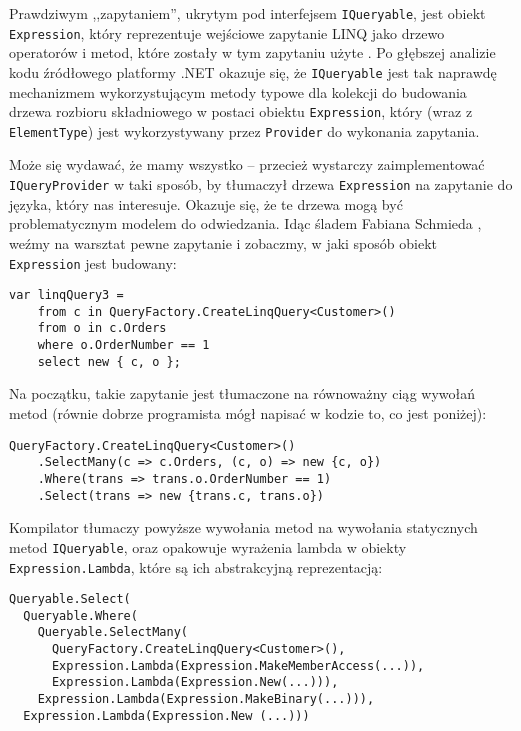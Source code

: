 Prawdziwym ,,zapytaniem'', ukrytym pod interfejsem \texttt{IQueryable}, jest obiekt \texttt{Expression}, który reprezentuje wejściowe zapytanie LINQ jako drzewo operatorów i metod, które zostały w tym zapytaniu użyte \cite{linq_queryable}. Po głębszej analizie kodu źródłowego platformy .NET okazuje się, że \texttt{IQueryable} jest tak naprawdę mechanizmem wykorzystującym metody typowe dla kolekcji do budowania drzewa rozbioru składniowego w postaci obiektu \texttt{Expression}, który (wraz z \texttt{ElementType}) jest wykorzystywany przez \texttt{Provider} do wykonania zapytania.

Może się wydawać, że mamy wszystko – przecież wystarczy zaimplementować \linebreak \texttt{IQueryProvider} w taki sposób, by tłumaczył drzewa \texttt{Expression} na zapytanie do języka, który nas interesuje. Okazuje się, że te drzewa mogą być problematycznym modelem do odwiedzania. Idąc śladem Fabiana Schmieda \cite{re-linq}, weźmy na warsztat pewne zapytanie i zobaczmy, w jaki sposób obiekt \texttt{Expression} jest budowany:

\begin{lstlisting}
var linqQuery3 = 
    from c in QueryFactory.CreateLinqQuery<Customer>()
    from o in c.Orders
    where o.OrderNumber == 1
    select new { c, o };
\end{lstlisting}

Na początku, takie zapytanie jest tłumaczone na równoważny ciąg wywołań metod (równie dobrze programista mógł napisać w kodzie to, co jest poniżej):

\begin{lstlisting}
QueryFactory.CreateLinqQuery<Customer>()
    .SelectMany(c => c.Orders, (c, o) => new {c, o})
    .Where(trans => trans.o.OrderNumber == 1)
    .Select(trans => new {trans.c, trans.o})
\end{lstlisting}

Kompilator tłumaczy powyższe wywołania metod na wywołania statycznych metod \texttt{IQueryable}, oraz opakowuje wyrażenia lambda w obiekty \linebreak \texttt{Expression.Lambda}, które są ich abstrakcyjną reprezentacją:

\begin{lstlisting}
Queryable.Select(
  Queryable.Where(
    Queryable.SelectMany(
      QueryFactory.CreateLinqQuery<Customer>(),
      Expression.Lambda(Expression.MakeMemberAccess(...)),
      Expression.Lambda(Expression.New(...))),
    Expression.Lambda(Expression.MakeBinary(...))),
  Expression.Lambda(Expression.New (...)))
\end{lstlisting}

